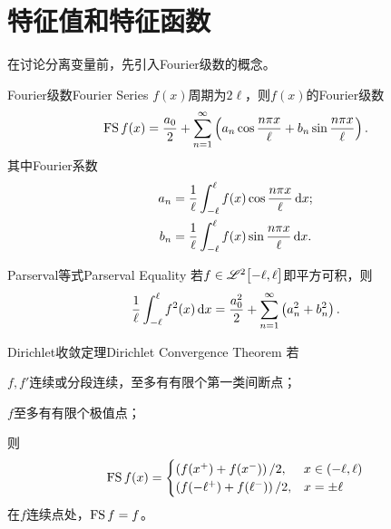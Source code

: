 \section{特征值和特征函数}
在讨论分离变量前，先引入Fourier级数的概念。
\begin{definition}{Fourier级数}{Fourier Series}
	$f(x)$周期为$2\ell$，则$f(x)$的Fourier级数
	\begin{align}
		\operatorname{FS} f(x)=\frac{a_0}2+\sum_{n=1}^\infty\left(a_n\cos\frac{n\pi x}\ell+b_n\sin\frac{n\pi x}\ell\right).
	\end{align}
	其中Fourier系数
	\begin{align*}
		a_n & =\frac1\ell\int_{-\ell}^\ell f(x)\cos\frac{n\pi x}\ell\mathop{}\!\mathrm{d} x; \\
		b_n & =\frac1\ell\int_{-\ell}^\ell f(x)\sin\frac{n\pi x}\ell\mathop{}\!\mathrm{d} x.
	\end{align*}
\end{definition}
\begin{theorem}{Parserval等式}{Parserval Equality}
	若$f\in\mathscr L^2\bigl[-\ell,\ell\bigr]$即平方可积，则
	\[
		\frac1\ell\int_{-\ell}^\ell f^2(x)\mathop{}\!\mathrm{d} x=\frac{a_0^2}2+\sum_{n=1}^\infty\left(a_n^2+b_n^2\right).
	\]
\end{theorem}
\begin{theorem}{Dirichlet收敛定理}{Dirichlet Convergence Theorem}
	若
	\begin{compactenum}
		\item $f,f'$连续或分段连续，至多有有限个第一类间断点；%
		\item $f$至多有有限个极值点；
	\end{compactenum}
	则
	\begin{align*}
		\operatorname{FS} f(x)
		=\begin{cases}
			\left(f(x^+)+f(x^-)\right)/2,        & x\in(-\ell,\ell) \\
			\left(f(-\ell^+)+f(\ell^-)\right)/2, & x=\pm\ell
		\end{cases}
	\end{align*}
	在$f$连续点处，$\operatorname{FS} f=f$。
\end{theorem}
